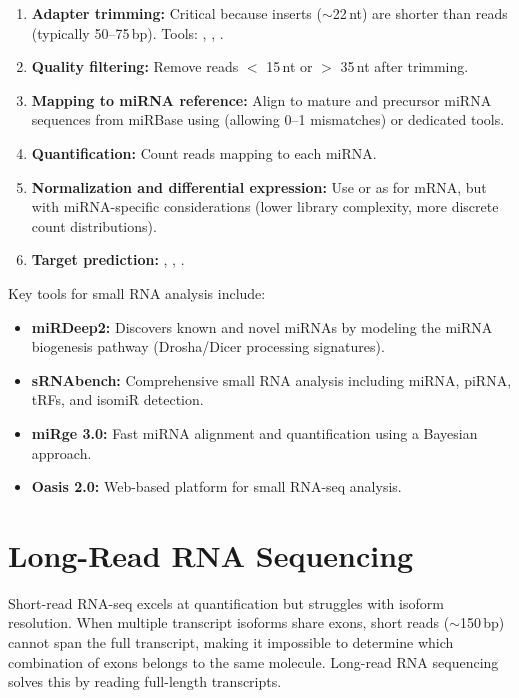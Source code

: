 \begin{enumerate}[nosep]
  \item \textbf{Adapter trimming:} Critical because inserts ($\sim$22\,nt)
    are shorter than reads (typically 50--75\,bp). Tools: ,
    , .
  \item \textbf{Quality filtering:} Remove reads $<$ 15\,nt or $>$ 35\,nt after
    trimming.
  \item \textbf{Mapping to miRNA reference:} Align to mature and precursor miRNA
    sequences from miRBase using  (allowing 0--1 mismatches)
    or dedicated tools.
  \item \textbf{Quantification:} Count reads mapping to each miRNA.
  \item \textbf{Normalization and differential expression:} Use
     or  as for mRNA, but with miRNA-specific
    considerations (lower library complexity, more discrete count
    distributions).
  \item \textbf{Target prediction:} , ,
    .
\end{enumerate}

Key tools for small RNA analysis include:
\begin{itemize}[nosep]
  \item \textbf{miRDeep2:} Discovers known and novel miRNAs by modeling the
    miRNA biogenesis pathway (Drosha/Dicer processing signatures).
  \item \textbf{sRNAbench:} Comprehensive small RNA analysis including miRNA,
    piRNA, tRFs, and isomiR detection.
  \item \textbf{miRge 3.0:} Fast miRNA alignment and quantification using a
    Bayesian approach.
  \item \textbf{Oasis 2.0:} Web-based platform for small RNA-seq analysis.
\end{itemize}


\section{Long-Read RNA Sequencing}
\label{sec:rnaseq:longread}

Short-read RNA-seq excels at quantification but struggles with isoform
resolution. When multiple transcript isoforms share exons, short reads
($\sim$150\,bp) cannot span the full transcript, making it impossible to
determine which combination of exons belongs to the same molecule. Long-read
RNA sequencing solves this by reading full-length transcripts.

